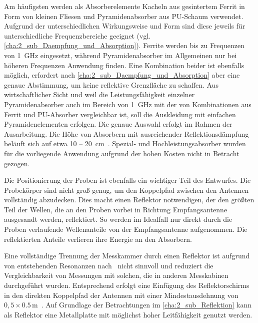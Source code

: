 \par
\vspace{\linespace}
Am häufigsten werden als Absorberelemente Kacheln aus gesintertem Ferrit in Form von kleinen Fliesen und Pyramidenabsorber aus PU-Schaum verwendet. Aufgrund der unterschiedlichen Wirkungsweise und Form sind diese jeweils für unterschiedliche Frequenzbereiche geeignet (vgl. \Abschnitt\ref{cha:2_sub_Daempfung_und_Absorption}). Ferrite werden bis zu Frequenzen von \SI{1}{\giga\hertz} eingesetzt, während Pyramidenabsorber im Allgemeinen nur bei höheren Frequenzen Anwendung finden. Eine Kombination beider ist ebenfalls möglich, erfordert nach \Abschnitt\ref{cha:2_sub_Daempfung_und_Absorption} aber eine genaue Abstimmung, um keine reflektive Grenzfläche zu schaffen. Aus wirtschaftlicher Sicht und weil die Leistungsfähigkeit einzelner Pyramidenabsorber auch im Bereich von \SI{1}{\giga\hertz} mit der von Kombinationen aus Ferrit und PU-Absorber vergleichbar ist, soll die Auskleidung mit einfachen Pyramidenelementen erfolgen. Die genaue Auswahl erfolgt im Rahmen der Ausarbeitung. Die Höhe von Absorbern mit ausreichender Reflektionsdämpfung beläuft sich auf etwa 10 -- \SI{20}{\centi\meter}~\cite{Holland_Shielding_Absorber, Telemeter_Produktseite, Eco_Messtechnik_Absorber}. Spezial- und Hochleistungsabsorber wurden für die vorliegende Anwendung aufgrund der hohen Kosten nicht in Betracht gezogen. 
\par
\vspace{\linespace} 
Die Positionierung der Proben ist ebenfalls ein wichtiger Teil des Entwurfes. Die Probekörper sind nicht groß genug, um den Koppelpfad zwischen den Antennen vollständig abzudecken. Dies macht einen Reflektor notwendigen, der den größten Teil der Wellen, die an den Proben vorbei in Richtung Empfangsantenne ausgesandt werden, reflektiert. So werden im Idealfall nur direkt durch die Proben verlaufende Wellenanteile von der Empfangsantenne aufgenommen. Die reflektierten Anteile verlieren ihre Energie an den Absorbern.   
\par
\vspace{\linespace}
Eine vollständige Trennung der Messkammer durch einen Reflektor ist aufgrund von entstehenden Resonanzen nach~\cite{Techniques_Shielding_Effectiveness_Far_Field_Simulation} nicht sinnvoll und reduziert die Vergleichbarkeit von Messungen mit solchen, die in anderen Messkabinen durchgeführt wurden. Entsprechend erfolgt eine Einfügung des Reflektorschirms in den direkten Koppelpfad der Antennen mit einer Mindestausdehnung von $0,5 \times 0.5\,\si{\meter}$~\cite{DIN_EN_61000-4-3}. Auf Grundlage der Betrachtungen im \Abschnitt\ref{cha:2_sub_Reflektion} kann als Reflektor eine Metallplatte mit möglichst hoher Leitfähigkeit genutzt werden.
